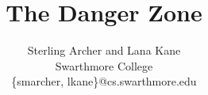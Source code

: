 \documentclass{sig-alternate}
\begin{document}
\date{}

\title{The Danger Zone}

\author{
    Sterling Archer and Lana Kane\\
    Swarthmore College\\
    \{smarcher, lkane\}@cs.swarthmore.edu
}

\maketitle










\balance
\end{document}
